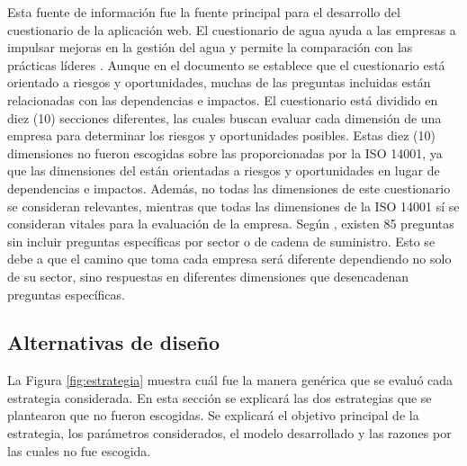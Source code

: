 Esta fuente de información fue la fuente principal para el desarrollo del cuestionario de la aplicación web. El cuestionario de agua ayuda a las empresas a impulsar mejoras en la gestión del agua y permite la comparación con las prácticas líderes \parencite{disclosure-insight-action-2023}. Aunque en el documento se establece que el cuestionario está orientado a riesgos y oportunidades, muchas de las preguntas incluidas están relacionadas con las dependencias e impactos. El cuestionario está dividido en diez (10) secciones diferentes, las cuales buscan evaluar cada dimensión de una empresa para determinar los riesgos y oportunidades posibles. Estas diez (10) dimensiones no fueron escogidas sobre las proporcionadas por la ISO 14001, ya que las dimensiones del \textcite{disclosure-insight-action-2023} están orientadas a riesgos y oportunidades en lugar de dependencias e impactos. Además, no todas las dimensiones de este cuestionario se consideran relevantes, mientras que todas las dimensiones de la ISO 14001 sí se consideran vitales para la evaluación de la empresa. Según \textcite{disclosure-insight-action-2023}, existen 85 preguntas sin incluir preguntas específicas por sector o de cadena de suministro. Esto se debe a que el camino que toma cada empresa será diferente dependiendo no solo de su sector, sino respuestas en diferentes dimensiones que desencadenan preguntas específicas.

\subsection{Alternativas de diseño} \label{subsec:alternativas-diseno}
La Figura \ref{fig:estrategia} muestra cuál fue la manera genérica que se evaluó cada estrategia considerada. En esta sección se explicará las dos estrategias que se plantearon que no fueron escogidas. Se explicará el objetivo principal de la estrategia, los parámetros considerados, el modelo desarrollado y las razones por las cuales no fue escogida. 

